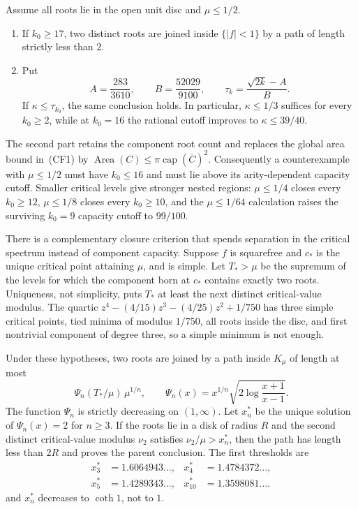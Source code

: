 \begin{theorem}
\label{res:first-merge-capacity-closures}
Assume all roots lie in the open unit disc and $\mu\le1/2$.

\begin{enumerate}[label=\textup{(\roman*)},leftmargin=*]
\item If $k_0\ge17$, two distinct roots are joined inside $\{|f|<1\}$ by a
path of length strictly less than $2$.
\item Put
\[
 A=\frac{283}{3610},\qquad B=\frac{52029}{9100},\qquad
 \tau_k=\frac{\sqrt{2k}-A}{B}.
\]
If $\kappa\le\tau_{k_0}$, the same conclusion holds.  In particular,
$\kappa\le1/3$ suffices for every $k_0\ge2$, while at $k_0=16$ the rational
cutoff improves to $\kappa\le39/40$.
\end{enumerate}
\end{theorem}

The second part retains the component root count and replaces the global area
bound in~(CF1) by
$\operatorname{Area}(C)\le\pi\operatorname{cap}(\overline C)^2$.
Consequently a counterexample with $\mu\le1/2$ must have $k_0\le16$ and must
lie above its arity-dependent capacity cutoff.  Smaller critical levels give
stronger nested regions: $\mu\le1/4$ closes every $k_0\ge12$,
$\mu\le1/8$ closes every $k_0\ge10$, and the $\mu\le1/64$ calculation raises
the surviving $k_0=9$ capacity cutoff to $99/100$.

There is a complementary closure criterion that spends separation in the
critical spectrum instead of component capacity.  Suppose $f$ is squarefree and $c_*$ is the unique critical point attaining
$\mu$, and is simple.  Let $T_*>\mu$ be the supremum of the levels for which
the component born at $c_*$ contains exactly two roots.  Uniqueness, not
simplicity, puts $T_*$ at least the next distinct critical-value modulus.
The quartic $z^4-(4/15)z^3-(4/25)z^2+1/750$ has three simple critical points,
tied minima of modulus $1/750$, all roots inside the disc, and first nontrivial
component of degree three, so a simple minimum is not enough.

\begin{theorem}
\label{res:minimal-hub-window}
Under these hypotheses, two roots are joined by a path inside $K_\mu$ of
length at most
\[
 \Psi_n(T_*/\mu)\,\mu^{1/n},\qquad
 \Psi_n(x)=x^{1/n}
   \sqrt{2\log\frac{x+1}{x-1}}.                     \tag{SW}
\]
The function $\Psi_n$ is strictly decreasing on $(1,\infty)$.  Let
$x_n^*$ be the unique solution of $\Psi_n(x)=2$ for $n\ge3$.  If the roots
lie in a disk of radius $R$ and the second distinct critical-value modulus
$\nu_2$ satisfies $\nu_2/\mu>x_n^*$, then the path has length less than
$2R$ and proves the parent conclusion.  The first thresholds are
\[
 \begin{aligned}
 x_3^*&=1.6064943\ldots,&
 x_4^*&=1.4784372\ldots,\\
 x_5^*&=1.4289343\ldots,&
 x_{10}^*&=1.3598081\ldots .
 \end{aligned}
\]
and $x_n^*$ decreases to $\coth 1$, not to $1$.
\end{theorem}


